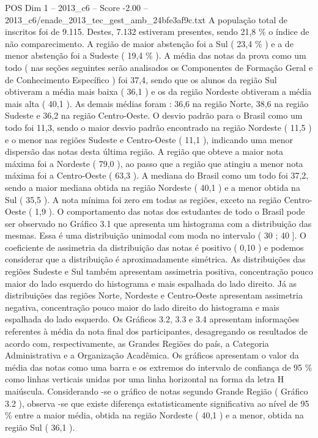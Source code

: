 \begin{textsample}{POS Dim 1 – 2013\_c6 – Score -2.00 – 2013\_c6/enade\_2013\_tec\_gest\_amb\_24bfe3af9c.txt}
A população total de inscritos foi de 9.115.
Destes, 7.132 estiveram presentes, sendo 21,8 \% o índice de não comparecimento.
A região de maior abstenção foi a Sul ( 23,4 \% ) e a de menor abstenção foi a Sudeste ( 19,4 \% ).
A média das notas da prova como um todo ( nas seções seguintes serão analisados os Componentes de Formação Geral e de Conhecimento Específico ) foi 37,4, sendo que os alunos da região Sul obtiveram a média mais baixa ( 36,1 ) e os da região Nordeste obtiveram a média mais alta ( 40,1 ).
As demais médias foram : 36,6 na região Norte, 38,6 na região Sudeste e 36,2 na região Centro-Oeste.
O desvio padrão para o Brasil como um todo foi 11,3, sendo o maior desvio padrão encontrado na região Nordeste ( 11,5 ) e o menor nas regiões Sudeste e Centro-Oeste ( 11,1 ), indicando uma menor dispersão das notas desta última região.
A região que obteve a maior nota máxima foi a Nordeste ( 79,0 ), ao passo que a região que atingiu a menor nota máxima foi a Centro-Oeste ( 63,3 ).
A mediana do Brasil como um todo foi 37,2, sendo a maior mediana obtida na região Nordeste ( 40,1 ) e a menor obtida na Sul ( 35,5 ).
A nota mínima foi zero em todas as regiões, exceto na região Centro-Oeste ( 1,9 ).
O comportamento das notas dos estudantes de todo o Brasil pode ser observado no Gráfico 3.1 que apresenta um histograma com a distribuição das mesmas.
Essa é uma distribuição unimodal com moda no intervalo ( 30 ; 40 ].
O coeficiente de assimetria da distribuição das notas é positivo ( 0,10 ) e podemos considerar que a distribuição é aproximadamente simétrica.
As distribuições das regiões Sudeste e Sul também apresentam assimetria positiva, concentração pouco maior do lado esquerdo do histograma e mais espalhada do lado direito.
Já as distribuições das regiões Norte, Nordeste e Centro-Oeste apresentam assimetria negativa, concentração pouco maior do lado direito do histograma e mais espalhada do lado esquerdo.
Os Gráficos 3.2, 3.3 e 3.4 apresentam informações referentes à média da nota final dos participantes, desagregando os resultados de acordo com, respectivamente, as Grandes Regiões do país, a Categoria Administrativa e a Organização Acadêmica.
Os gráficos apresentam o valor da média das notas como uma barra e os extremos do intervalo de confiança de 95 \% como linhas verticais unidas por uma linha horizontal na forma da letra H maiúscula.
Considerando -se o gráfico de notas segundo Grande Região ( Gráfico 3.2 ), observa -se que existe diferença estatisticamente significativa ao nível de 95 \% entre a maior média, obtida na região Nordeste ( 40,1 ) e a menor, obtida na região Sul ( 36,1 ).

\end{textsample}

